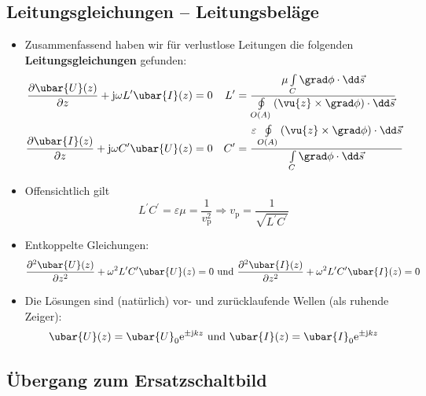 \subsection{Leitungsgleichungen -- Leitungsbeläge}
\begin{itemize}
	\item Zusammenfassend haben wir für verlustlose Leitungen die folgenden \textbf{Leitungsgleichungen} gefunden:
	\begin{align}
		\frac{\partial  \ubar{U}(z)}{\partial z} + \mathrm{j}\omega L^\prime  \ubar{I}(z) & = 0 & L^\prime & =\frac{\mu\int\limits_C\grad \phi \cdot \dd \vec{s}}{\oint\limits_{O(A)} \left(\vu{z}\times\grad \phi\right) \cdot \dd\vec{s}}         \\
		\frac{\partial  \ubar{I}(z)}{\partial z} +\mathrm{j}\omega C^\prime  \ubar{U}(z)  & = 0 & C^\prime & = \frac{\varepsilon\oint\limits_{O(A)}\left(\vu{z}\times \grad \phi\right) \cdot \dd \vec{s}}{\int\limits_C \grad \phi\cdot\dd\vec{s}}
	\end{align}
	\item Offensichtlich gilt
	\begin{equation}
		L^\prime C^\prime = \varepsilon\mu = \frac{1}{ v_\mathrm{p}^2} \Rightarrow \boxed{ v_\mathrm{p} = \frac{1}{\sqrt{L^\prime C^\prime}}}
	\end{equation}
	\item Entkoppelte Gleichungen:
	\begin{equation}
		\frac{\partial^2  \ubar{U}(z)}{\partial z^2} + \omega^2 L^\prime C^\prime  \ubar{U}(z) = 0 \text{ und } \frac{\partial^2  \ubar{I}(z)}{\partial z^2} + \omega^2 L^\prime C^\prime  \ubar{I}(z) = 0
	\end{equation}
	\item Die Lösungen sind (natürlich) vor- und zurücklaufende Wellen (als ruhende Zeiger):
	\begin{equation}
		\ubar{U}(z) =  \ubar{U}_0  \mathrm{e}^{\pm\mathrm{j}kz} \text{ und }  \ubar{I}(z) =  \ubar{I}_0  \mathrm{e}^{\pm\mathrm{j}kz}
	\end{equation}
\end{itemize}
\subsection{Übergang zum Ersatzschaltbild}
\begin{center}
	
\end{center}

